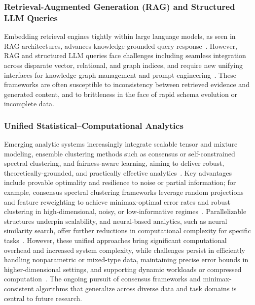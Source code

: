 \documentclass[sigconf]{acmart}
\begin{document}
\subsubsection*{Retrieval-Augmented Generation (RAG) and Structured LLM Queries}
Embedding retrieval engines tightly within large language models, as seen in RAG architectures, advances knowledge-grounded query response~\cite{ref110,ref115,ref116}. However, RAG and structured LLM queries face challenges including seamless integration across disparate vector, relational, and graph indices, and require new unifying interfaces for knowledge graph management and prompt engineering~\cite{ref110,ref115}. These frameworks are often susceptible to inconsistency between retrieved evidence and generated content, and to brittleness in the face of rapid schema evolution or incomplete data.

\subsubsection*{Unified Statistical--Computational Analytics}
Emerging analytic systems increasingly integrate scalable tensor and mixture modeling, ensemble clustering methods such as consensus or self-constrained spectral clustering, and fairness-aware learning, aiming to deliver robust, theoretically-grounded, and practically effective analytics~\cite{ref36,ref110,ref116,ref117,ref118}. Key advantages include provable optimality and resilience to noise or partial information; for example, consensus spectral clustering frameworks leverage random projections and feature reweighting to achieve minimax-optimal error rates and robust clustering in high-dimensional, noisy, or low-informative regimes~\cite{ref116,ref117}. Parallelizable structures underpin scalability, and neural-based analytics, such as neural similarity search, offer further reductions in computational complexity for specific tasks~\cite{ref36}. However, these unified approaches bring significant computational overhead and increased system complexity, while challenges persist in efficiently handling nonparametric or mixed-type data, maintaining precise error bounds in higher-dimensional settings, and supporting dynamic workloads or compressed computation~\cite{ref110,ref116,ref118}. The ongoing pursuit of consensus frameworks and minimax-consistent algorithms that generalize across diverse data and task domains is central to future research.
\end{document}
